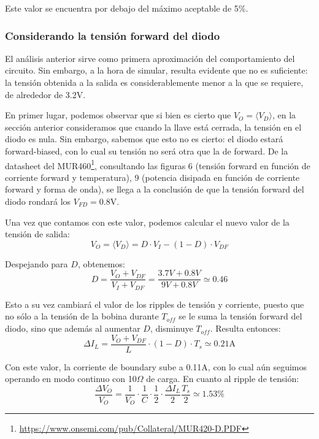 \documentclass[e4_tp1_main.tex]{subfiles}
\begin{document}
Este valor se encuentra por debajo del m\'aximo aceptable de 5\%.


\subsubsection{Considerando la tensi\'on forward del diodo}

El an\'alisis anterior sirve como primera aproximaci\'on del comportamiento del circuito. Sin embargo, a la hora de simular, resulta evidente que no es suficiente: la tensi\'on obtenida a la salida es considerablemente menor a la que se requiere, de alrededor de 3.2V.

En primer lugar, podemos observar que si bien es cierto que $V_O = \langle V_D \rangle$, en la secci\'on anterior consideramos que cuando la llave est\'a cerrada, la tensi\'on en el diodo es nula. Sin embargo, sabemos que esto no es cierto: el diodo estar\'a forward-biased, con lo cual su tensi\'on no ser\'a otra que la de forward. De la datasheet del 
MUR460\footnote{
	\url{https://www.onsemi.com/pub/Collateral/MUR420-D.PDF}
}, consultando las figuras 6 (tensi\'on forward en funci\'on de corriente forward y temperatura), 9 (potencia disipada en funci\'on de corriente forward y forma de onda), se llega a la conclusi\'on de que la tensi\'on forward del diodo rondar\'a los $V_{FD}= 0.8$V.

Una vez que contamos con este valor, podemos calcular el nuevo valor de la tensi\'on de salida: 
\begin{equation}
	V_O = \langle V_D \rangle = D \cdot V_I - (1-D) \cdot V_{DF}   
\end{equation}

Despejando para $D$, obtenemos:
\begin{equation}
	D = \frac{V_O + V_{DF}}{V_I + V_{DF}} 
	= \frac{3.7V + 0.8V}{9V + 0.8V} 
	\simeq 0.46 
\end{equation}

Esto a su vez cambiar\'a el valor de los ripples de tensi\'on y corriente, puesto que no s\'olo a la tensi\'on de la bobina durante $T_{off}$ se le suma la tensi\'on forward del diodo, sino que adem\'as al aumentar $D$, disminuye $T_{off}$. Resulta entonces: 
\begin{equation}
	\Delta I_L = \frac{V_O + V_{DF}}{L} \cdot (1-D) \cdot T_s
	\simeq 0.21\text{A}
\end{equation} 

Con este valor, la corriente de boundary sube a 0.11A, con lo cual a\'un seguimos operando en modo continuo con 10$\Omega$ de carga. En cuanto al ripple de tensi\'on:
\begin{equation}
\frac{\Delta V_O}{V_O}  
= \frac{1}{V_O} 
\cdot \frac{1}{C} \cdot \frac{1}{2} \cdot \frac{\Delta I_L}{2} \frac{T_s}{2}
\simeq 1.53 \%
\label{eq:result-ripple-diodo}
\end{equation}
\end{document}
